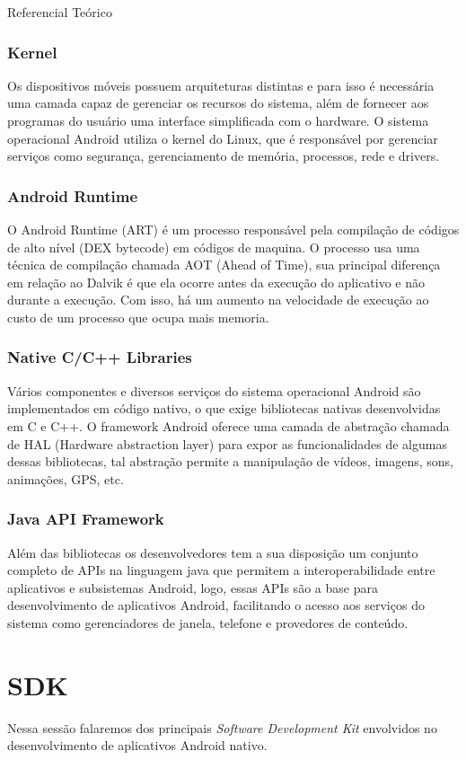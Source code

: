 \documentclass[
	12pt,				%
	openright,			%
	twoside,			%
	a4paper,			%
	english,			%
	french,				%
	spanish,			%
	brazil				%
	]{abntex2}
\begin{document}
\begin{chapter}{Referencial Teórico}
\subsubsection{Kernel}
Os dispositivos móveis possuem arquiteturas distintas e para isso é necessária uma camada capaz de gerenciar os recursos do sistema, além de fornecer aos programas do usuário uma interface simplificada com o hardware.
O sistema operacional Android utiliza o kernel do Linux, que é responsável por gerenciar serviços como segurança, gerenciamento de memória, processos, rede e drivers.


\subsubsection{Android Runtime}
O Android Runtime (ART) é um processo responsável pela compilação de códigos de alto nível (DEX bytecode) em códigos de maquina.
O processo usa uma técnica de compilação chamada AOT (Ahead of Time), sua principal diferença em relação ao Dalvik é que ela ocorre antes 
da execução do aplicativo e não durante a execução. Com isso, há um aumento na velocidade de execução ao custo de um processo que ocupa mais memoria.

\subsubsection{Native C/C++ Libraries}
Vários componentes e diversos serviços do sistema operacional Android são implementados em código nativo,
 o que exige bibliotecas nativas desenvolvidas em C e C++.
O framework Android oferece uma camada de abstração chamada de HAL (Hardware abstraction layer) para expor as funcionalidades de algumas dessas bibliotecas,
 tal abstração permite a manipulação de vídeos, imagens, sons, animações, GPS, etc.



\subsubsection{Java API Framework}
Além das bibliotecas os desenvolvedores tem a sua disposição um conjunto completo de APIs na linguagem java que permitem a interoperabilidade entre aplicativos e subsistemas Android, logo, essas APIs são a base para desenvolvimento de aplicativos Android, facilitando o acesso aos serviços do sistema como gerenciadores de janela, telefone e provedores de conteúdo.
\section{SDK}
Nessa sessão falaremos dos principais \textit{Software Development Kit} envolvidos no desenvolvimento de aplicativos Android nativo.

\end{chapter}
\end{document}
